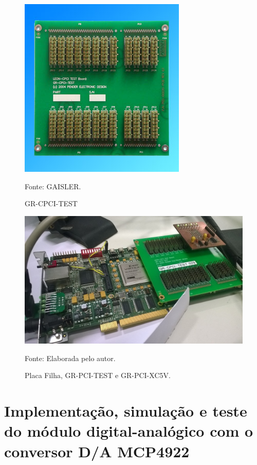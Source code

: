 \begin{figure}[!htb]
	\centering
	\caption{GR-CPCI-TEST}
	\includegraphics[scale = .9]{Imagens/cpci-test}
	
	Fonte: GAISLER.
	
	\label{cpci-test}
\end{figure}

\begin{figure}[H]
	\centering
	\caption{Placa Filha, GR-PCI-TEST e GR-PCI-XC5V.}
	\includegraphics[scale = .8, angle = 90]{Imagens/PlacaFilha_GRPCI}
	
	Fonte: Elaborada pelo autor.
	
	\label{PlacaFilha_GRPCI}
\end{figure}


\section{Implementação, simulação e teste do módulo digital-analógico com o conversor D/A MCP4922}


